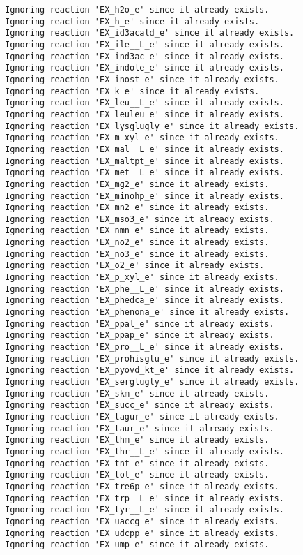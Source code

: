 \documentclass[
  letterpaper,
  DIV=11,
  numbers=noendperiod]{scrartcl}
\begin{document}
\begin{verbatim}
Ignoring reaction 'EX_h2o_e' since it already exists.
Ignoring reaction 'EX_h_e' since it already exists.
Ignoring reaction 'EX_id3acald_e' since it already exists.
Ignoring reaction 'EX_ile__L_e' since it already exists.
Ignoring reaction 'EX_ind3ac_e' since it already exists.
Ignoring reaction 'EX_indole_e' since it already exists.
Ignoring reaction 'EX_inost_e' since it already exists.
Ignoring reaction 'EX_k_e' since it already exists.
Ignoring reaction 'EX_leu__L_e' since it already exists.
Ignoring reaction 'EX_leuleu_e' since it already exists.
Ignoring reaction 'EX_lysglugly_e' since it already exists.
Ignoring reaction 'EX_m_xyl_e' since it already exists.
Ignoring reaction 'EX_mal__L_e' since it already exists.
Ignoring reaction 'EX_maltpt_e' since it already exists.
Ignoring reaction 'EX_met__L_e' since it already exists.
Ignoring reaction 'EX_mg2_e' since it already exists.
Ignoring reaction 'EX_minohp_e' since it already exists.
Ignoring reaction 'EX_mn2_e' since it already exists.
Ignoring reaction 'EX_mso3_e' since it already exists.
Ignoring reaction 'EX_nmn_e' since it already exists.
Ignoring reaction 'EX_no2_e' since it already exists.
Ignoring reaction 'EX_no3_e' since it already exists.
Ignoring reaction 'EX_o2_e' since it already exists.
Ignoring reaction 'EX_p_xyl_e' since it already exists.
Ignoring reaction 'EX_phe__L_e' since it already exists.
Ignoring reaction 'EX_phedca_e' since it already exists.
Ignoring reaction 'EX_phenona_e' since it already exists.
Ignoring reaction 'EX_ppal_e' since it already exists.
Ignoring reaction 'EX_ppap_e' since it already exists.
Ignoring reaction 'EX_pro__L_e' since it already exists.
Ignoring reaction 'EX_prohisglu_e' since it already exists.
Ignoring reaction 'EX_pyovd_kt_e' since it already exists.
Ignoring reaction 'EX_serglugly_e' since it already exists.
Ignoring reaction 'EX_skm_e' since it already exists.
Ignoring reaction 'EX_succ_e' since it already exists.
Ignoring reaction 'EX_tagur_e' since it already exists.
Ignoring reaction 'EX_taur_e' since it already exists.
Ignoring reaction 'EX_thm_e' since it already exists.
Ignoring reaction 'EX_thr__L_e' since it already exists.
Ignoring reaction 'EX_tnt_e' since it already exists.
Ignoring reaction 'EX_tol_e' since it already exists.
Ignoring reaction 'EX_tre6p_e' since it already exists.
Ignoring reaction 'EX_trp__L_e' since it already exists.
Ignoring reaction 'EX_tyr__L_e' since it already exists.
Ignoring reaction 'EX_uaccg_e' since it already exists.
Ignoring reaction 'EX_udcpp_e' since it already exists.
Ignoring reaction 'EX_ump_e' since it already exists.

\end{verbatim}
\end{document}
